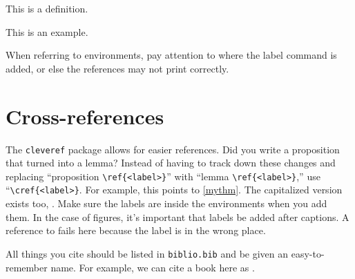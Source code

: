\begin{Def}
This is a definition.
\end{Def}

\begin{Ex}
This is an example. 
\end{Ex}

When referring to environments, pay attention to where the label command is added, or else the references may not print correctly.

\section{Cross-references}
The \texttt{cleveref} package allows for easier references. Did you write a proposition that turned into a lemma? Instead of having to track down these changes and replacing ``proposition \verb|\ref{<label>}|'' with ``lemma \verb|\ref{<label>}|,'' use ``\verb|\cref{<label>}|. For example, this points to \cref{mythm}. The capitalized version exists too, . Make sure the labels are inside the environments when you add them. In the case of figures, it's important that labels be added after captions. A reference to  fails here because the label is in the wrong place. 

All things you cite should be listed in \texttt{biblio.bib} and be given an easy-to-remember name. For example, we can cite a book here as \cite{sample}. 
